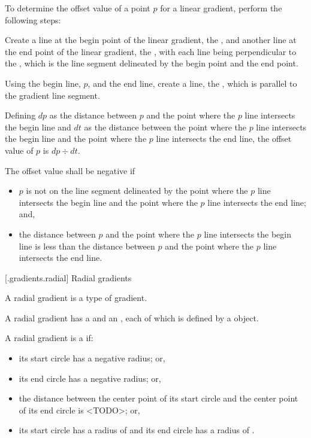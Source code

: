 \pnum
To determine the offset value of a point $p$ for a linear gradient, perform the following steps:
\begin{enumeratea}
\item Create a line at the begin point of the linear gradient, the , and another line at the end point of the linear gradient, the , with each line being perpendicular to the , which is the line segment delineated by the begin point and the end point.

\item Using the begin line, $p$, and the end line, create a line, the , which is parallel to the gradient line segment.

\item Defining $dp$ as the distance between $p$ and the point where the $p$ line intersects the begin line and $dt$ as the distance between the point where the $p$ line intersects the begin line and the point where the $p$ line intersects the end line, the offset value of $p$ is $dp \div dt$.

\item The offset value shall be negative if
\begin{itemize}
\item $p$ is not on the line segment delineated by the point where the $p$ line intersects the begin line and the point where the $p$ line intersects the end line; and,

\item the distance between $p$ and the point where the $p$ line intersects the begin line is less than the distance between $p$ and the point where the $p$ line intersects the end line.
\end{itemize}
\end{enumeratea}

 [\iotwod.gradients.radial] {Radial gradients}

\pnum
A radial gradient is a type of gradient.

\pnum
A radial gradient has a  and an , each of which is defined by a  object.

\pnum
A radial gradient is a  if:
\begin{itemize}
\item its start circle has a negative radius; or,
\item its end circle has a negative radius; or,
\item the distance between the center point of its start circle and the center point of its end circle is <TODO>; or,
\item its start circle has a radius of  and its end circle has a radius of .
\end{itemize}

